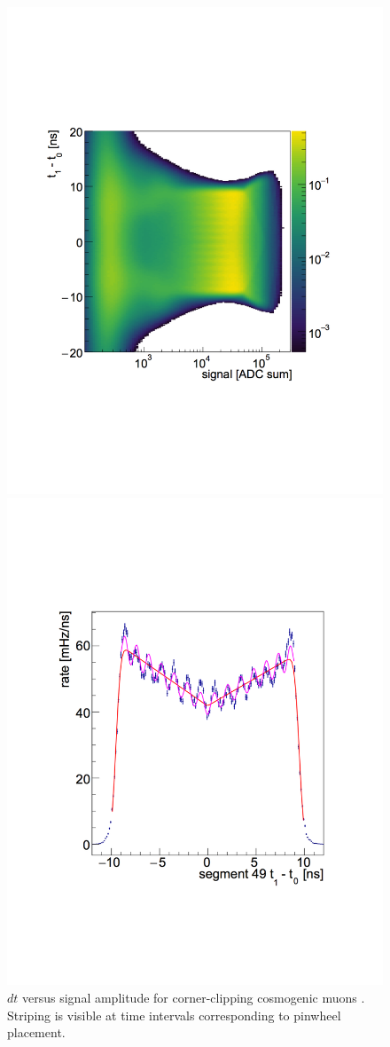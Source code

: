 \begin{figure}[h]
	\begin{minipage}[h]{0.5\linewidth}
		\centering
		\includegraphics[width=0.85\linewidth]{tex/5-analysis-images/dt_S_Hobbes}
		\caption{$dt$ versus signal amplitude for corner-clipping cosmogenic muons \cite{MM:2314}. Striping is visible at time intervals corresponding to pinwheel placement.}
		\label{fig:dtshobbes}
	\end{minipage}
	\begin{minipage}[h]{0.5\linewidth}
		\centering
		\includegraphics[width=0.75\linewidth]{tex/5-analysis-images/HobbesFit}

\end{minipage}
\end{figure}
